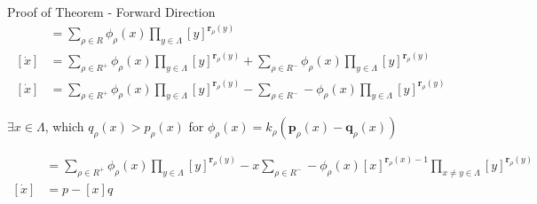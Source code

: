 \begin{frame}{Proof of Theorem - Forward Direction}
\begin{align*}
	[\dot x] & = \sum_{\rho \in R} \phi_{\rho}(x) \prod_{y \in \Lambda} [y]^{\textbf{r}_{\rho}(y)} \\  
	[\dot x] & = \sum_{\rho \in R^+} \phi_{\rho}(x) \prod_{y \in \Lambda} [y]^{\textbf{r}_{\rho}(y)} + \sum_{\rho \in R^-} \phi_{\rho}(x) \prod_{y \in \Lambda} [y]^{\textbf{r}_{\rho}(y)} \\
	[\dot x] & = \sum_{\rho \in R^+} \phi_{\rho}(x) \prod_{y \in \Lambda} [y]^{\textbf{r}_{\rho}(y)} - \sum_{\rho \in R^-} -\phi_{\rho}(x) \prod_{y \in \Lambda} [y]^{\textbf{r}_{\rho}(y)}
\end{align*}
	\begin{center} \(\exists x \in \Lambda\), which \(q_{\rho}(x) > p_{\rho}(x)\) for \(\phi_{\rho}(x) = k_{\rho}(\textbf{p}_{\rho}(x) - \textbf{q}_{\rho}(x))\) \end{center}
\begin{align*}
	[\dot x] & = \sum_{\rho \in R^+} \phi_{\rho}(x) \prod_{y \in \Lambda} [y]^{\textbf{r}_{\rho}(y)} - x\sum_{\rho \in R^-} -\phi_{\rho}(x) [x]^{\textbf{r}_{\rho}(x)-1} \prod_{x \neq y \in \Lambda} [y]^{\textbf{r}_{\rho}(y)} \\
	[\dot x] & = p - [x]q
\end{align*}
\end{frame}
